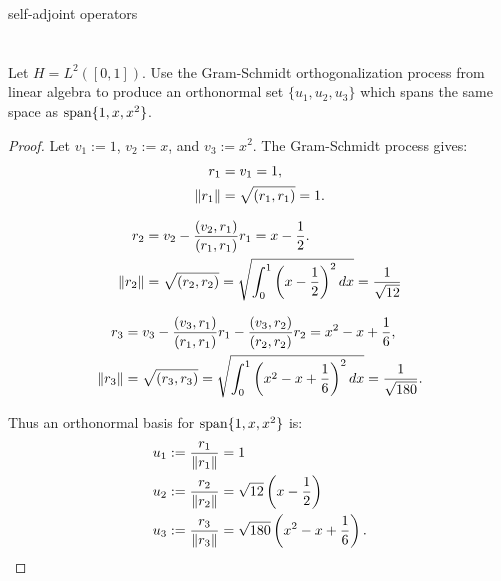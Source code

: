 {\color{red} self-adjoint operators}

\section*{}

\begin{exercise}
Let $H = L^2([0,1])$. Use the Gram-Schmidt orthogonalization process from linear algebra to produce an orthonormal set $\{u_1,u_2,u_3\}$ which spans the same space as $\operatorname{span}\{1,x,x^2\}$.
\end{exercise}
\begin{proof}
    Let $v_1 := 1$, $v_2 := x$, and $v_3 := x^2$. The Gram-Schmidt process gives:
        \begin{equation*}
        \begin{split}
            r_1 &= v_1 = 1, \\
            \left\lVert r_1 \right\rVert &= \sqrt{(r_1,r_1)} = 1.
        \end{split}
        \end{equation*}

        \begin{equation*}
        \begin{split}
            r_2 &= v_2 - \frac{(v_2,r_1)}{(r_1,r_1)} r_1  = x - \frac{1}{2}. \\
            \left\lVert r_2 \right\rVert &= \sqrt{(r_2,r_2)} = \sqrt{\int_0^1 \left(x-\frac12\right)^2 dx} = \frac{1}{\sqrt{12}}
        \end{split}
        \end{equation*}

        \begin{equation*}
        \begin{split}
            r_3 &= v_3 - \frac{(v_3,r_1)}{(r_1,r_1)} r_1 - \frac{(v_3,r_2)}{(r_2,r_2)} r_2 = x^2 - x + \frac{1}{6}, \\
            \left\lVert r_3 \right\rVert & = \sqrt{(r_3,r_3)} = \sqrt{\int_0^1 \left(x^2-x+\frac16\right)^2 dx} = \frac{1}{\sqrt{180}}.
        \end{split}
        \end{equation*}

        Thus an orthonormal basis for $\operatorname{span}\{1,x,x^2\}$ is:
            \begin{equation*}
            \begin{split}
                u_1 &:= \frac{r_1}{\left\lVert r_1 \right\rVert} = 1 \\
                u_2 &:= \frac{r_2}{\left\lVert r_2 \right\rVert} = \sqrt{12}\left(x-\frac{1}{2}\right) \\
                u_3 &:= \frac{r_3}{\left\lVert r_3 \right\rVert} = \sqrt{180} \left( x^2 - x + \frac{1}{6} \right). \qedhere
            \end{split}
            \end{equation*}
    \end{proof}

